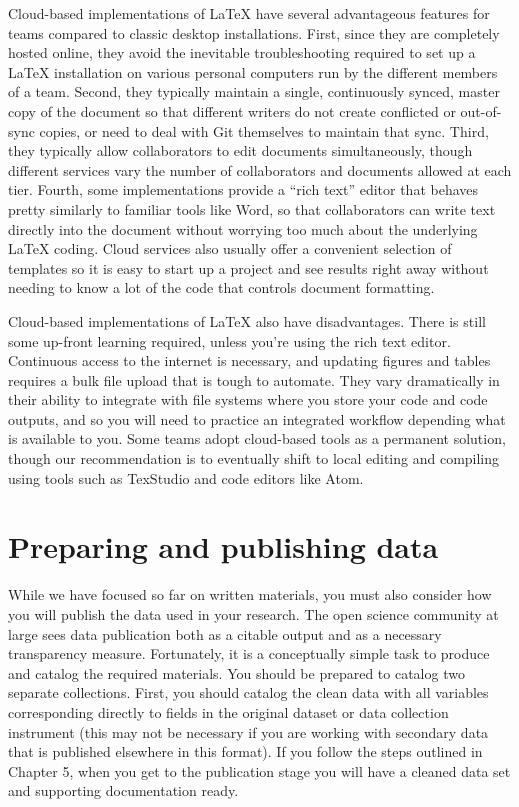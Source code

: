 Cloud-based implementations of {\LaTeX} have several advantageous features
for teams compared to classic desktop installations.
First, since they are completely hosted online,
they avoid the inevitable troubleshooting required to set up a {\LaTeX} installation
on various personal computers run by the different members of a team.
Second, they typically maintain a single, continuously synced, master copy of the document
so that different writers do not create conflicted or out-of-sync copies,
or need to deal with Git themselves to maintain that sync.
Third, they typically allow collaborators to edit documents simultaneously,
though different services vary the number of collaborators and documents allowed at each tier.
Fourth, some implementations provide a ``rich text'' editor
that behaves pretty similarly to familiar tools like Word,
so that collaborators can write text directly into the document without worrying too much
about the underlying {\LaTeX} coding.
Cloud services also usually offer a convenient selection of templates
so it is easy to start up a project and see results right away
without needing to know a lot of the code that controls document formatting.

Cloud-based implementations of {\LaTeX} also have disadvantages.
There is still some up-front learning required, unless you're using the rich text editor.
Continuous access to the internet is necessary,
and updating figures and tables requires a bulk file upload that is tough to automate.
They vary dramatically in their ability to integrate
with file systems where you store your code and code outputs,
and so you will need to practice an integrated workflow depending what is available to you.
Some teams adopt cloud-based tools as a permanent solution,
though our recommendation is to eventually shift to
local editing and compiling using tools such as TexStudio and code editors like Atom.


\section{Preparing and publishing data}

While we have focused so far on written materials,
you must also consider how you will publish
the data used in your research.
The open science community at large sees data publication
both as a citable output and as a necessary transparency measure.
Fortunately, it is a conceptually simple task to produce
and catalog the required materials.
You should be prepared to catalog two separate collections.
First, you should catalog the clean data
with all variables corresponding directly
to fields in the original dataset or data collection instrument
(this may not be necessary if you are working with secondary data
that is published elsewhere in this format).
If you follow the steps outlined in Chapter 5,
when you get to the publication stage you will have
a cleaned data set and supporting documentation ready.

